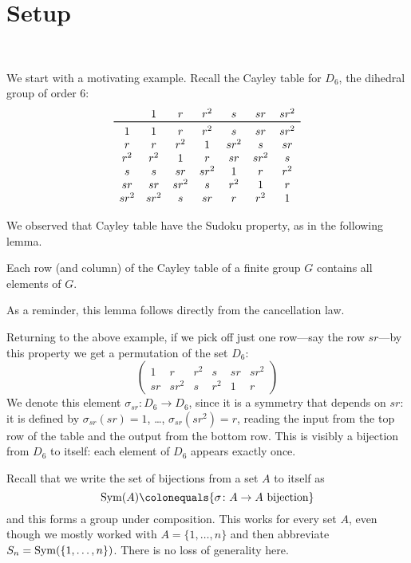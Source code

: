 \documentclass[11pt, reqno]{amsart}
\begin{document}
\section{Setup}~\label{sec:setup}

We start with a motivating example.  Recall the Cayley table for $D_6$, the dihedral group of order $6$:
\[ \begin{array}{c  cccccccc} 
& 1 & r & r^2 & s & sr & sr^2 \\
\toprule
1 & 1 & r & r^2 & s & sr & sr^2 \\
r & r & r^2 & 1 & sr^2 & s & sr \\
r^2 & r^2 & 1 & r & sr & sr^2 & s \\
s & s & sr & sr^2 & 1 & r & r^2 \\
sr & sr & sr^2 & s & r^2 & 1 & r \\
sr^2 & sr^2 & s & sr & r & r^2 & 1
\end{array} \]

We observed that Cayley table have the Sudoku property, as in the following lemma.

\begin{lem}
Each row (and column) of the Cayley table of a finite group $G$ contains all elements of $G$.
\end{lem}

As a reminder, this lemma follows directly from the cancellation law.

Returning to the above example, if we pick off just one row---say the row $sr$---by this property we get a permutation of the set $D_6$:
\begin{equation}  \label{eqn:sr}
\begin{pmatrix}
1 & r & r^2 & s & sr & sr^2 \\
sr & sr^2 & s & r^2 & 1 & r 
\end{pmatrix} 
\end{equation}
We denote this element $\sigma_{sr} \colon D_6 \to D_6$, since it is a symmetry that depends on $sr$: it is defined by $\sigma_{sr}(sr) = 1$, \dots, $\sigma_{sr}(sr^2)=r$, reading the input from the top row of the table and the output from the bottom row.  This is visibly a bijection from $D_6$ to itself: each element of $D_6$ appears exactly once.  

Recall that we write the set of bijections from a set $A$ to itself as
\[ \Sym(A) \colonequals \{\sigma \colon A \to A \textup{ bijection}\} \]
and this forms a group under composition.  This works for every set $A$, even though we mostly worked with $A=\{1,\dots,n\}$ and then abbreviate $S_n=\operatorname{Sym}(\{1,\dots,n\})$.  There is no loss of generality here.
\end{document}
